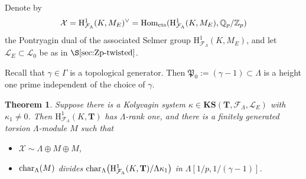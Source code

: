 \documentclass[10pt]{amsart}
\numberwithin{equation}{section}
\newtheorem{theorem}{Theorem}
\theoremstyle{definition}
\theoremstyle{remark}
\newcommand{\Z}{\mathbb{Z}}
\newcommand{\cL}{\mathscr{L}}
\newcommand{\Fcal}{\mathcal{F}}
\newcommand{\Q}{\mathbb{Q}}
\newcommand{\rH}{\mathrm{H}}
\begin{document}
Denote by 
\[
\mathcal{X}=\rH^1_{\Fcal_\Lambda}(K,M_E)^\vee={\rm Hom}_{\rm cts}(\rH^1_{\Fcal_\Lambda}(K,M_E),\Q_p/\Z_p) 
\] 
the Pontryagin dual of the 
associated Selmer group $\rH^1_{\Fcal_\Lambda}(K,M_E)$, and let $\cL_E\subset\cL_0$ be as in $\S\ref{sec:Zp-twisted}$.

Recall that $\gamma\in \Gamma$ is a topological generator. Then $\mathfrak{P}_0:=(\gamma-1)\subset \Lambda$ is a height one prime independent of the choice of $\gamma$.

\begin{theorem}\label{thm:howard}
Suppose there is a Kolyvagin system $\kappa\in\mathbf{KS}(\mathbf{T},\Fcal_\Lambda,\cL_E)$ with $\kappa_1\neq 0$. Then $\rH^1_{\Fcal_\Lambda}(K,\mathbf{T})$ has $\Lambda$-rank one, and there is a finitely generated torsion $\Lambda$-module $M$ such that
\begin{itemize}
\item[(i)] $\mathcal{X}\sim\Lambda\oplus M\oplus M$,
\item[(ii)] ${\rm char}_\Lambda(M)$ divides ${\rm char}_\Lambda\bigl(\rH^1_{\Fcal_\Lambda}(K,\mathbf{T})/\Lambda\kappa_1\bigr)$ in $\Lambda[1/p,1/(\gamma-1)]$.
\end{itemize}
\end{theorem}
\end{document}
